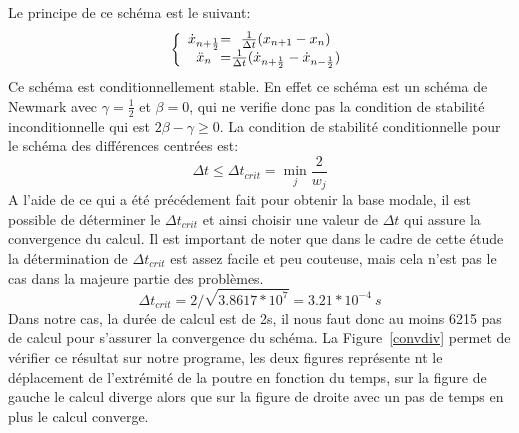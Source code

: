 \documentclass[]{article}
\begin{document}
Le principe de ce schéma est le suivant:
\[
\left \{
\begin{array}{c @{=} c}
    \dot{x}_{n+\frac{1}{2}} & \frac{1}{\Delta t} ( x_{n+1} - x_{n} ) \\
    \ddot{x}_{n} & \frac{1}{\Delta t} ( \dot{x}_{n+\frac{1}{2}} -
\dot{x}_{n-\frac{1}{2}} ) \\
\end{array}
\right.
\]
Ce schéma est conditionnellement stable. En effet ce schéma est un schéma de
Newmark avec $\gamma=\frac{1}{2}$ et $\beta=0$, qui ne verifie donc pas la
condition de stabilité inconditionnelle qui est $2\beta-\gamma\geq0$. La
condition de stabilité conditionnelle pour le schéma des différences centrées
est:
$$ \Delta t \leq \Delta t_{crit}= \min_{j} \frac{2}{w_{j}}$$
A l'aide de ce qui a été précédement fait pour obtenir la base modale, il est
possible de déterminer le $\Delta t_{crit}$ et ainsi choisir une valeur de
$\Delta t$ qui assure la convergence du calcul. Il est important de noter que
dans le cadre de cette étude la détermination de $\Delta t_{crit}$ est assez
facile et peu couteuse, mais cela n'est pas le cas dans la majeure partie des
problèmes.
$$
\Delta t_{crit} = 2 / \sqrt{3.8617*10^{7}} = 3.21*10^{-4}\ s
$$
Dans notre cas, la durée de calcul est de 2s, il nous faut donc au moins 6215
pas de calcul pour s'assurer la convergence du schéma. La Figure~\ref{convdiv}
permet de vérifier ce résultat sur notre programe, les deux figures représente
nt le déplacement de l'extrémité de la poutre en fonction du temps, sur la
figure de gauche le calcul diverge alors que sur la figure de droite avec un
pas de temps en plus le calcul converge. 
\end{document}
